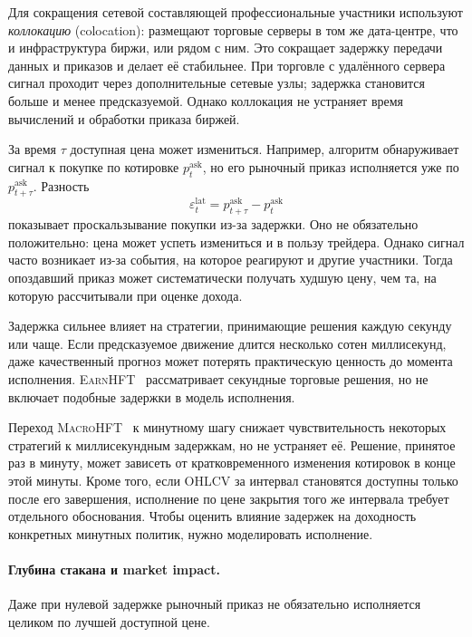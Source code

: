 \documentclass[9pt,a4paper,twocolumn]{extarticle}
\newcommand{\Macro}{\textsc{MacroHFT}}
\newcommand{\Earn}{\textsc{EarnHFT}}
\begin{document}
Для сокращения сетевой составляющей профессиональные участники используют \emph{коллокацию}
(colocation): размещают торговые серверы в том же дата-центре, что и инфраструктура биржи, или
рядом с ним. Это сокращает задержку передачи данных и приказов и делает её стабильнее. При
торговле с удалённого сервера сигнал проходит через дополнительные сетевые узлы; задержка
становится больше и менее предсказуемой. Однако коллокация не устраняет время вычислений и
обработки приказа биржей.

За время $\tau$ доступная цена может измениться. Например, алгоритм обнаруживает сигнал к
покупке по котировке $p_t^{\mathrm{ask}}$, но его рыночный приказ исполняется уже по
$p_{t+\tau}^{\mathrm{ask}}$. Разность
\begin{equation}
    \varepsilon_t^{\mathrm{lat}}
    =
    p_{t+\tau}^{\mathrm{ask}}
    -p_t^{\mathrm{ask}}
    \label{eq:latency_slippage}
\end{equation}
показывает проскальзывание покупки из-за задержки. Оно не обязательно положительно: цена может
успеть измениться и в пользу трейдера. Однако сигнал часто возникает из-за события, на которое
реагируют и другие участники. Тогда опоздавший приказ может систематически получать худшую цену,
чем та, на которую рассчитывали при оценке дохода.

Задержка сильнее влияет на стратегии, принимающие решения каждую секунду или чаще. Если
предсказуемое движение длится несколько сотен миллисекунд, даже качественный прогноз может
потерять практическую ценность до момента исполнения. \Earn{}~\cite{qin2024earnhft}
рассматривает секундные торговые решения, но не включает подобные задержки в модель исполнения.

Переход \Macro{}~\cite{zong2024macrohft} к минутному шагу снижает чувствительность некоторых
стратегий к миллисекундным задержкам, но не устраняет её. Решение, принятое раз в минуту, может
зависеть от кратковременного изменения котировок в конце этой минуты. Кроме того, если OHLCV за
интервал становятся доступны только после его завершения, исполнение по цене закрытия того же
интервала требует отдельного обоснования. Чтобы оценить влияние задержек на доходность
конкретных минутных политик, нужно моделировать исполнение.

\paragraph{Глубина стакана и market impact.}

Даже при нулевой задержке рыночный приказ не обязательно исполняется целиком по лучшей доступной
цене.
\end{document}
